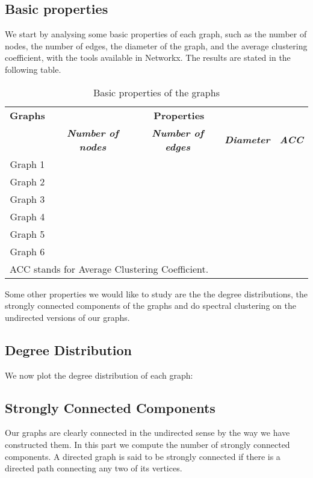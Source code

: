 \documentclass[conference]{IEEEtran}
\begin{document}
\subsection{Basic properties}
We start by analysing some basic properties of each graph, such as the number of nodes, the number of edges, the diameter of the graph, and the average clustering coefficient, with the tools available in Networkx. The results are stated in the  following table. 

\begin{table}[htbp]
\caption{Basic properties of the graphs}
\begin{center}
\begin{tabular}{|c|c|c|c|c|}
\hline
\textbf{Graphs}&\multicolumn{4}{|c|}{\textbf{Properties}} \\
\cline{2-5} 
\textbf{ } & \textbf{\textit{Number of nodes}}& \textbf{\textit{Number of edges}}& \textbf{\textit{Diameter}} & \textbf{\textit{ACC}}\\
\hline
Graph 1 & & & & \\
\hline
Graph 2& & & & \\
\hline
Graph 3& & & & \\
\hline
Graph 4& & & & \\
\hline
Graph 5& & & & \\
\hline
Graph 6 & & & & \\
\hline
\multicolumn{4}{l}{ACC stands for Average Clustering Coefficient.} \\
\end{tabular}
\end{center}
\end{table}

Some other properties we would like to  study are the the degree distributions, the strongly connected components of the graphs and do spectral clustering on the undirected versions of our graphs. 
\subsection{Degree Distribution}
We now plot the degree distribution of each graph: 
\subsection{Strongly Connected Components}
Our graphs are clearly connected in the undirected sense by the way we have constructed them. In this part we compute the number of strongly connected components. A directed graph is said to be strongly connected if there is a directed path connecting any two of its vertices. 
\end{document}

